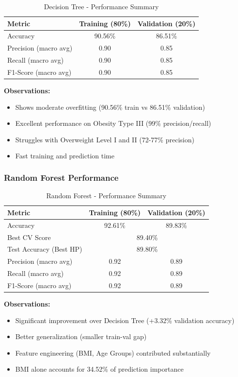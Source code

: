 \documentclass[12pt,a4paper]{article}
\begin{document}
\begin{table}[H]
\centering
\caption{Decision Tree - Performance Summary}
\begin{tabular}{lcc}
\toprule
\textbf{Metric} & \textbf{Training (80\%)} & \textbf{Validation (20\%)} \\
\midrule
Accuracy & 90.56\% & 86.51\% \\
Precision (macro avg) & 0.90 & 0.85 \\
Recall (macro avg) & 0.90 & 0.85 \\
F1-Score (macro avg) & 0.90 & 0.85 \\
\bottomrule
\end{tabular}
\end{table}

\textbf{Observations:}
\begin{itemize}
    \item Shows moderate overfitting (90.56\% train vs 86.51\% validation)
    \item Excellent performance on Obesity Type III (99\% precision/recall)
    \item Struggles with Overweight Level I and II (72-77\% precision)
    \item Fast training and prediction time
\end{itemize}

\subsubsection{Random Forest Performance}

\begin{table}[H]
\centering
\caption{Random Forest - Performance Summary}
\begin{tabular}{lcc}
\toprule
\textbf{Metric} & \textbf{Training (80\%)} & \textbf{Validation (20\%)} \\
\midrule
Accuracy & 92.61\% & 89.83\% \\
Best CV Score & \multicolumn{2}{c}{89.40\%} \\
Test Accuracy (Best HP) & \multicolumn{2}{c}{89.80\%} \\
\midrule
Precision (macro avg) & 0.92 & 0.89 \\
Recall (macro avg) & 0.92 & 0.89 \\
F1-Score (macro avg) & 0.92 & 0.89 \\
\bottomrule
\end{tabular}
\end{table}

\textbf{Observations:}
\begin{itemize}
    \item Significant improvement over Decision Tree (+3.32\% validation accuracy)
    \item Better generalization (smaller train-val gap)
    \item Feature engineering (BMI, Age Groups) contributed substantially
    \item BMI alone accounts for 34.52\% of prediction importance
\end{itemize}
\end{document}
